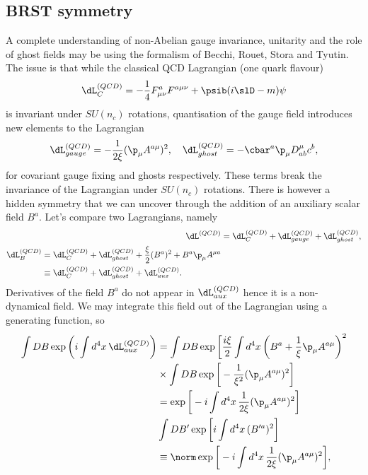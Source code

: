 \subsection{BRST symmetry}
A complete understanding of non-Abelian gauge invariance, unitarity and the role of ghost fields may be using the formalism of Becchi, Rouet, Stora and Tyutin. The issue is that while the classical QCD Lagrangian (one quark flavour)
\begin{equation}
    \dL^{(QCD)}_{C} = -\frac{1}{4}F^a_{\mu\nu}F^{a\mu\nu} + \psib(i\slD - m)\psi
\end{equation}
is invariant under $SU(n_c)$ rotations, quantisation of the gauge field introduces new elements to the Lagrangian 
\begin{equation}
    \dL^{(QCD)}_{gauge} = -\frac{1}{2\xi}(\p_\mu A^{a\mu})^2,\quad \dL_{ghost}^{(QCD)} = -\cbar^a \p_\mu D^\mu_{ab}c^b,
\end{equation}
for covariant gauge fixing and ghosts respectively. These terms break the invariance of the Lagrangian under $SU(n_c)$ rotations. There is however a hidden symmetry that we can uncover through the addition of an auxiliary scalar field $B^a$. Let's compare two Lagrangians, namely
\begin{align}
    \dL^{(QCD)} &= \dL^{(QCD)}_C + \dL^{(QCD)}_{gauge} + \dL_{ghost}^{(QCD)}, \\
    \begin{split}
        \dL^{(QCD)}_B &= \dL^{(QCD)}_C + \dL^{(QCD)}_{ghost} + \frac{\xi}{2}(B^a)^2 + B^a\p_\mu A^{\mu a} \\
        &\equiv \dL_C^{(QCD)} + \dL^{(QCD)}_{ghost} + \dL^{(QCD)}_{aux}.
    \end{split}
\end{align}
Derivatives of the field $B^a$ do not appear in $\dL^{(QCD)}_{aux}$ hence it is a non-dynamical field. We may integrate this field out of the Lagrangian using a generating function, so
\begin{equation}
    \begin{split}
        \int DB\exp{\bigg(i\int d^4x\,\dL^{(QCD)}_{aux}\bigg)} &= \int DB\exp{\bigg[\frac{i\xi}{2}\int d^4x\,\bigg(B^a + \frac{1}{\xi}\p_\mu A^{a\mu}\bigg)^2} \\
        &\times \int DB\exp{\bigg[-\frac{1}{\xi^2}(\p_\mu A^{a\mu})^2\bigg]} \\
        &= \exp{\bigg[-i\int d^4x\,\frac{1}{2\xi}(\p_\mu A^{a\mu})^2\bigg]} \\
        &\int DB'\exp{\bigg[i\int d^4x\,(B'^{a})^2\bigg]} \\
        &\equiv \norm\exp{\bigg[-i\int d^4x\,\frac{1}{2\xi}(\p_\mu A^{a\mu})^2\bigg]},
    \end{split}
\end{equation}

